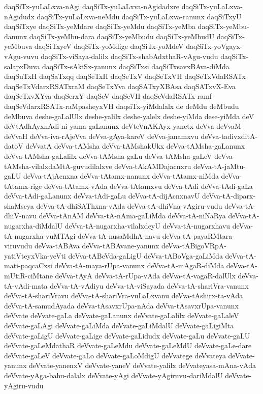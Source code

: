 {daqSiTx-yuLaLxva-nAgi
daqSiTx-yuLaLxva-nAgidadxre
daqSiTx-yuLaLxva-nAgidudx
daqSiTx-yuLaLxva-neMdu
daqSiTx-yuLaLxva-ranunx
daqSiTxyU
daqSiTxye
daqSiTx-yeMdare
daqSiTx-yeMdu
daqSiTx-yeMba
daqSiTx-yeMbu-danunx
daqSiTx-yeMbu-dara
daqSiTx-yeMbudu
daqSiTx-yeMbudU
daqSiTx-yeMbuva
daqSiTxyeV
daqSiTx-yoMdige
daqSiTx-yoMdeV
daqSiTx-yoVgayx-vAgu-vuvu
daqSiTx-viSaya-dalilx
daqSiTx-shabAdxthaR-vAgu-vudu
daqSiTx-salapxDuva
daqSiTx-sAkiSx-yanunx
daqSiTxsi
daqSiTxsavxBAva-diMda
daqSuTxH
daqSaTxqq
daqSeTxH
daqSeTxV
daqSeTxVH
daqSeTxVdaRSATx
daqSeTxVdarxRSATxraM
daqSeTxYva
daqSATxyXBAsa
daqSATxvX-Eva
daqSeTxvXYva
daqSerxY
daqSeV
daqSeVH
daqSeVdaRSATx-ramf
daqSeVdarxRSATx-raMpasheyxVH
daqsiTx-yiMdalalx
de
deMdu
deMbudu
deMbuva
deshe-gaLalUlx
deshe-yalilx
deshe-yalelx
deshe-yiMda
dese-yiMda
deV
deVtAdhAyxnAdi-ni-yama-gaLanunx
deVteVnAKAyx-yanetx
deVva
deVvaM
deVvaH
deVva-iva-rAjeVva
deVva-gAya-kareV
deVva-janamxvu
deVva-tadivxditA-datoV
deVvatA
deVva-tAMsha
deVva-tAMshakUkx
deVva-tAMsha-gaLanunx
deVva-tAMsha-gaLalilx
deVva-tAMsha-gaLu
deVva-tAMsha-gaLeV
deVva-tAMsha-vilalxdaMtA-guvudilalxve
deVva-tAkAMDajacnxru
deVva-tA-jaMtu-gaLU
deVva-tAjAcnxna
deVva-tAtamx-nanunx
deVva-tAtamx-niMda
deVva-tAtamx-rige
deVva-tAtamx-vAda
deVva-tAtamxvu
deVva-tAdi
deVva-tAdi-gaLa
deVva-tAdi-gaLanunx
deVva-tAdi-gaLu
deVva-tA-dijAcnxnavU
deVva-tA-diparx-shaMseya
deVva-tA-dhiSAThxna-vAda
deVva-tA-dhiVna-vAgiru-vudu
deVva-tA-dhiV-navu
deVva-tAnAM
deVva-tA-nAma-gaLiMda
deVva-tA-niNaRya
deVva-tA-nugarxha-diMdalU
deVva-tA-nugarxha-vilalxdeyU
deVva-tA-nugarxhavu
deVva-tA-nugarxha-vuMTAgi
deVva-tA-nusaMdhA-navu
deVva-tA-payaRMtara-viruvudu
deVva-tABAva
deVva-tABAvane-yanunx
deVva-tABigoVRpA-yatiVteyxVka-yeVti
deVva-tABeVda-gaLigU
deVva-tABoVga-gaLiMda
deVva-tA-mati-paqcaCxsi
deVva-tA-maya-rUpa-vanunx
deVva-tA-mAgaR-diMda
deVva-tA-mUtiR-ciMtane
deVva-tAyA
deVva-tA-rUpa-vAda
deVva-tA-vagaR-dalUlx
deVva-tA-vAdi-mata
deVva-tA-vAdiyu
deVva-tA-viSayada
deVva-tA-shariVra-vanunx
deVva-tA-shariVravu
deVva-tA-shariVra-vuLaLxvanu
deVva-tAshirx-ta-vAda
deVva-tA-samudAyada
deVva-tAsavxrUpa-nAda
deVva-tAsavxrUpa-vanunx
deVvate
deVvate-gaLa
deVvate-gaLanunx
deVvate-gaLalilx
deVvate-gaLaleV
deVvate-gaLAgi
deVvate-gaLiMda
deVvate-gaLiMdalU
deVvate-gaLigiMta
deVvate-gaLigU
deVvate-gaLige
deVvate-gaLidudx
deVvate-gaLu
deVvate-gaLU
deVvate-gaLeMdathaR
deVvate-gaLeMdu
deVvate-gaLeMdU
deVvate-gaLe-dare
deVvate-gaLeV
deVvate-gaLo
deVvate-gaLoMdigU
deVvatege
deVvateya
deVvate-yanunx
deVvate-yanenxV
deVvate-yaneV
deVvate-yalilx
deVvateyasa-mAna-vAda
deVvate-yAga-bahu-dalalx
deVvate-yAgi
deVvate-yAgiruvu-dariMdalU
deVvate-yAgiru-vudu
}
